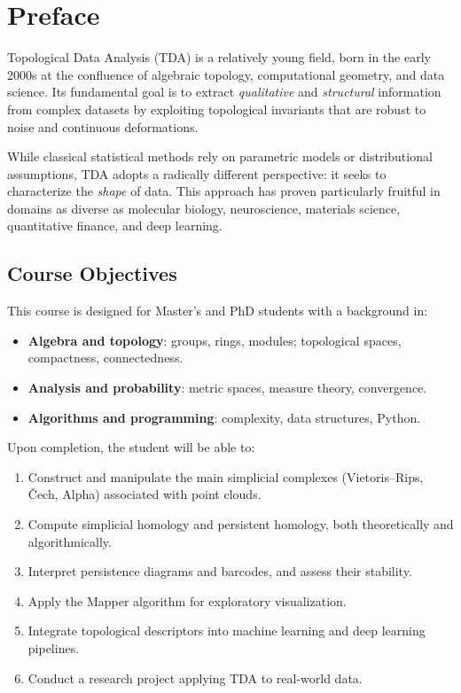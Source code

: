 \chapter*{Preface}

Topological Data Analysis (TDA) is a relatively young field, born in the
early 2000s at the confluence of algebraic topology, computational geometry,
and data science. Its fundamental goal is to extract \emph{qualitative} and
\emph{structural} information from complex datasets by exploiting topological
invariants that are robust to noise and continuous deformations.

\medskip

While classical statistical methods rely on parametric models or distributional
assumptions, TDA adopts a radically different perspective: it seeks to
characterize the \emph{shape} of data. This approach has proven particularly
fruitful in domains as diverse as molecular biology, neuroscience, materials
science, quantitative finance, and deep learning.

\section*{Course Objectives}

This course is designed for Master's and PhD students with a background in:
\begin{itemize}
  \item \textbf{Algebra and topology}: groups, rings, modules; topological
        spaces, compactness, connectedness.
  \item \textbf{Analysis and probability}: metric spaces, measure theory,
        convergence.
  \item \textbf{Algorithms and programming}: complexity, data structures,
        Python.
\end{itemize}

Upon completion, the student will be able to:
\begin{enumerate}
  \item Construct and manipulate the main simplicial complexes
        (Vietoris--Rips, \v{C}ech, Alpha) associated with point clouds.
  \item Compute simplicial homology and persistent homology, both
        theoretically and algorithmically.
  \item Interpret persistence diagrams and barcodes, and assess their
        stability.
  \item Apply the Mapper algorithm for exploratory visualization.
  \item Integrate topological descriptors into machine learning and deep
        learning pipelines.
  \item Conduct a research project applying TDA to real-world data.
\end{enumerate}

